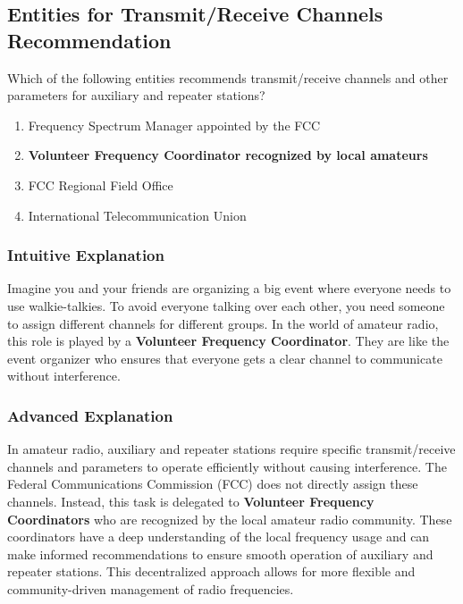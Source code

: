 \subsection{Entities for Transmit/Receive Channels Recommendation}
\label{T1A08}

\begin{tcolorbox}[colback=gray!10!white,colframe=black!75!black,title=T1A08]
Which of the following entities recommends transmit/receive channels and other parameters for auxiliary and repeater stations?
\begin{enumerate}[label=\Alph*,noitemsep]
    \item Frequency Spectrum Manager appointed by the FCC
    \item \textbf{Volunteer Frequency Coordinator recognized by local amateurs}
    \item FCC Regional Field Office
    \item International Telecommunication Union
\end{enumerate}
\end{tcolorbox}

\subsubsection*{Intuitive Explanation}
Imagine you and your friends are organizing a big event where everyone needs to use walkie-talkies. To avoid everyone talking over each other, you need someone to assign different channels for different groups. In the world of amateur radio, this role is played by a \textbf{Volunteer Frequency Coordinator}. They are like the event organizer who ensures that everyone gets a clear channel to communicate without interference.

\subsubsection*{Advanced Explanation}
In amateur radio, auxiliary and repeater stations require specific transmit/receive channels and parameters to operate efficiently without causing interference. The Federal Communications Commission (FCC) does not directly assign these channels. Instead, this task is delegated to \textbf{Volunteer Frequency Coordinators} who are recognized by the local amateur radio community. These coordinators have a deep understanding of the local frequency usage and can make informed recommendations to ensure smooth operation of auxiliary and repeater stations. This decentralized approach allows for more flexible and community-driven management of radio frequencies.